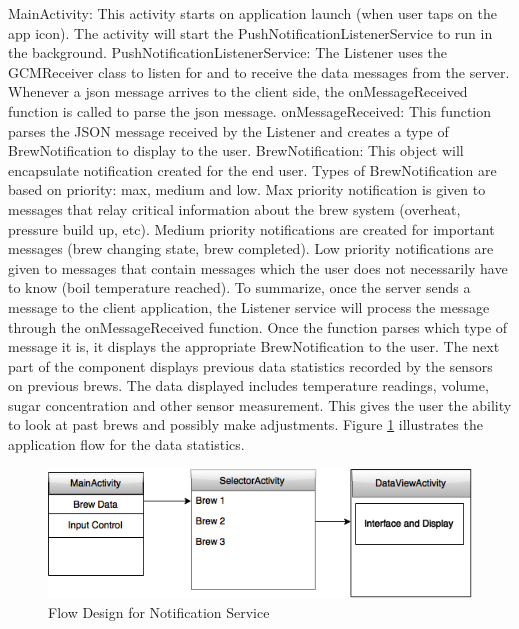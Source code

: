 \documentclass{article}
\begin{document}
MainActivity: This activity starts on application launch (when user taps on the app icon). The activity will start the PushNotificationListenerService to run in the background.
PushNotificationListenerService: The Listener uses the GCMReceiver class to listen for and to receive the data messages from the server. Whenever a \gls{json} message arrives to the client side, the onMessageReceived function is called to parse the \gls{json} message.
onMessageReceived: This function parses the JSON message received by the Listener and creates a type of BrewNotification to display to the user.
BrewNotification: This object will encapsulate notification created for the end user. Types of BrewNotification are based on priority: max, medium and low. Max priority notification is given to messages that relay critical information about the brew system (overheat, pressure build up, etc). Medium priority notifications are created for important messages (brew changing state, brew completed). Low priority notifications are given to messages that contain messages which the user does not necessarily have to know (boil temperature reached).
To summarize, once the server sends a message to the client application,  the Listener service will process the message through the onMessageReceived function. Once the function parses which type of message it is, it displays the appropriate BrewNotification to the user.
The next part of the component displays previous data statistics recorded by the sensors on previous brews. The data displayed includes temperature readings, volume, sugar concentration and other sensor measurement. This gives the user the ability to look at past brews and possibly make adjustments. Figure \ref{fig:data-statistics} illustrates the application flow for the data statistics.

\begin{figure}[H]
\begin{center}
\includegraphics[scale=0.50]{data-statistics.png}
\caption{Flow Design for Notification Service}
\label{fig:data-statistics}
\end{center}
\end{figure}
\end{document}
